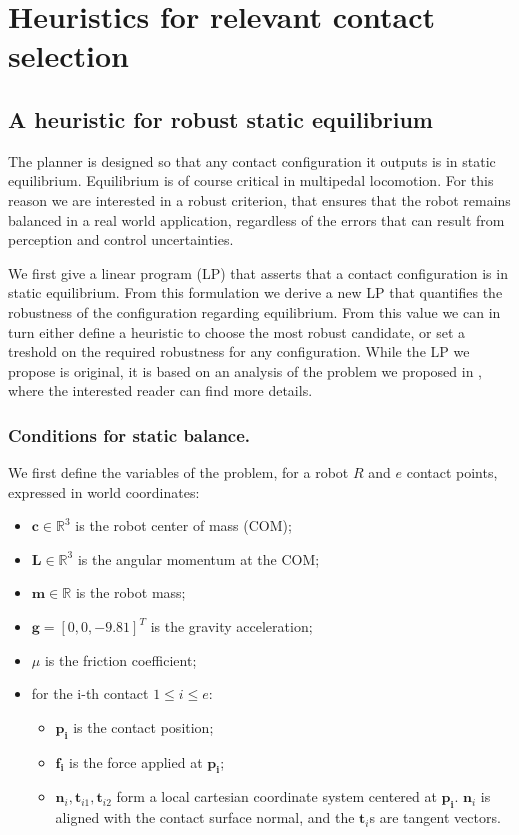 \section{Heuristics for relevant contact selection}

\subsection{A heuristic for robust static equilibrium}
The planner is designed so that any contact configuration it outputs is in static equilibrium.
Equilibrium is of course critical in multipedal locomotion. For this reason we are interested in a robust 
criterion, that ensures that the robot remains balanced in a real world application, regardless of the errors
that can result from perception and control uncertainties.

We first give a linear program (LP) that asserts that a contact configuration is in static equilibrium.
From this formulation we derive a new LP that quantifies the robustness of the configuration regarding equilibrium.
From this value we can in turn either define a heuristic to choose the most robust candidate, or set a treshold on the required robustness
for any configuration. While the LP we propose is original, it is based on an analysis of the problem we proposed in \cite{Prete2016}, where the interested reader
can find more details.


\subsubsection{Conditions for static balance.}
We first define the variables of the problem, for a robot $R$ and $e$ contact points, expressed in world coordinates:
\begin{itemize}
\item $\mathbf{c} \in \mathbb{R}^3$ is the robot center of mass (COM);
\item $\mathbf{L}  \in \mathbb{R}^3 $ is the angular momentum at the COM;
\item $\mathbf{m} \in \mathbb{R}$ is the robot mass;
\item $\mathbf{g} = [0,0,-9.81]^T$ is the gravity acceleration;
\item $\mu$ is the friction coefficient;
\item for the i-th contact $1 \leq i \leq e$:
	\begin{itemize}
	\item $\mathbf{p_i}$ is the contact position;
	\item $\mathbf{f_i}$ is the force applied at $\mathbf{p_i}$;
	\item $\mathbf{n}_i,\mathbf{t}_{i1},\mathbf{t}_{i2}$ form a local cartesian coordinate system centered at $\mathbf{p_i}$. $\mathbf{n}_i$ is aligned
	with the contact surface normal, and the $\mathbf{t}_i$s are tangent vectors.
	\end{itemize}
\end{itemize}

